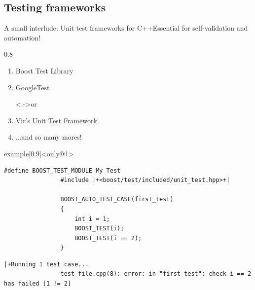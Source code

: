 \subsection{Testing frameworks}
\begin{frame}[fragile]{A small interlude: Unit test frameworks for C++}{Essential for self-validation and automation!}
    \vspace{2mm}
    \begin{overlayarea}{\textwidth}{0.8\textheight}
        \begin{enumerate}[<only@+->]
            \setlength{\itemindent}{3mm}
            \item {} Boost Test Library\hfill
            \parbox{0.4\textwidth}{\footnotesize{}}
            \item {} GoogleTest \hfill
            \parbox{0.4\textwidth}{
                \footnotesize
                 \uncover<.->{or
                    }
            }
            \item {} Vir's Unit Test Framework\hfill
            \parbox{0.4\textwidth}{\footnotesize{}}
            \item[] {\small ...and so many mores!}\hfill
            \parbox{0.4\textwidth}{
                \footnotesize
            }
        \end{enumerate}
        \begin{varblock}{example}[0.9\textwidth]{}<only@1>
            \begin{lstlisting}[style=MyCpp]
                #define BOOST_TEST_MODULE My Test
                #include |+<boost/test/included/unit_test.hpp>+|

                BOOST_AUTO_TEST_CASE(first_test)
                {
                    int i = 1;
                    BOOST_TEST(i);
                    BOOST_TEST(i == 2);
                }
            \end{lstlisting}
            \begin{lstlisting}[style=MyBash]
                |+Running 1 test case...
                test_file.cpp(8): error: in "first_test": check i == 2 has failed [1 != 2]


\end{lstlisting}
\end{varblock}
\end{overlayarea}
\end{frame}
